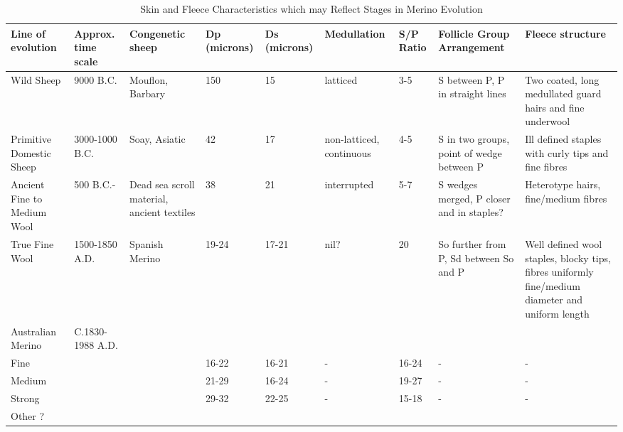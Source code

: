%

\begin{landscape}
\begin{table}
\centering
\caption{Skin and Fleece Characteristics which may Reflect Stages in Merino Evolution}
\label{tb:2}
\vspace{0.1in}
\begin{tabular}{p{0.7in}|p{0.6in}|p{0.6in}|l|l|p{0.7in}|l|p{1.0in}|p{1.2in}}  \hline

 Line of evolution &  Approx. time scale & Congenetic sheep &  Dp (microns) &  Ds (microns) & Medullation  &  S/P Ratio &  Follicle Group Arrangement &   Fleece structure \\ \hline \hline

Wild Sheep &  9000 B.C. & Mouflon, Barbary & 150  &  15  &  latticed &  3-5 & S between P, P  in straight lines & Two coated, long medullated guard hairs and fine underwool \\ \hline

Primitive Domestic Sheep & 3000-1000 B.C. &  Soay, Asiatic & 42 & 17 & non-latticed, continuous &  4-5  & S in two groups, point of wedge between P & Ill defined staples with curly tips and fine fibres \\ \hline

Ancient Fine to Medium Wool &  500 B.C.- &  Dead sea scroll material, ancient textiles & 38 & 21 & interrupted & 5-7 & S wedges merged, P closer and in staples?    &  Heterotype hairs, fine/medium fibres \\ \hline

True Fine Wool & 1500-1850 A.D. &  Spanish Merino & 19-24 & 17-21 & nil? & 20 & So further from P, Sd between So and P& Well defined wool staples, blocky tips, fibres uniformly fine/medium diameter and uniform length \\ \hline

Australian Merino &  C.1830-1988 A.D. & & & & & & & \\
  Fine    &  & &  16-22 &  16-21 &   -  &  16-24 &  - &  - \\
  Medium  &  & &  21-29 &  16-24 &   -  &  19-27 &  - &  - \\
  Strong  &  & &  29-32 &  22-25 &   -  &  15-18 &  - &  - \\ 
  Other ? & & & & & & & & \\ \hline

\end{tabular}
\end{table}
\end{landscape}

%
